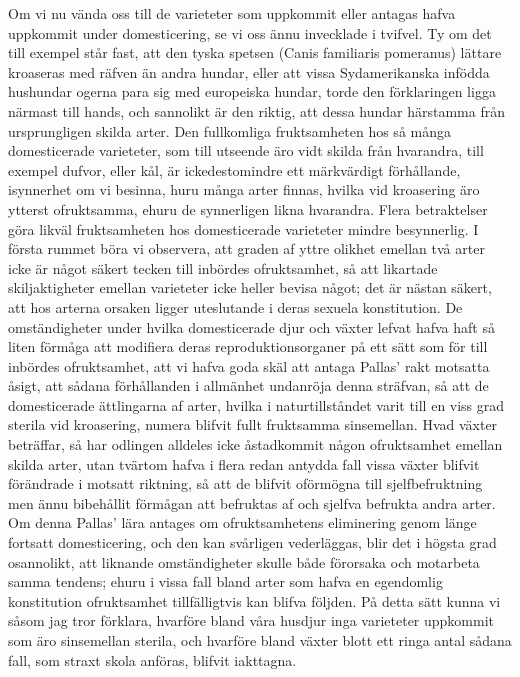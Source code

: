 Om vi nu vända oss till de varieteter som uppkommit eller antagas hafva uppkommit under domesticering, se vi oss ännu invecklade i tvifvel. Ty om det till exempel står fast, att den tyska spetsen (Canis familiaris pomeranus) lättare kroaseras med räfven än andra hundar, eller att vissa Sydamerikanska infödda hushundar ogerna para sig med europeiska hundar, torde den förklaringen ligga närmast till hands, och sannolikt är den riktig, att dessa hundar härstamma från ursprungligen skilda arter. Den fullkomliga fruktsamheten hos så många domesticerade varieteter, som till utseende äro vidt skilda från hvarandra, till exempel dufvor, eller kål, är ickedestomindre ett märkvärdigt förhållande, isynnerhet om vi besinna, huru många arter finnas, hvilka vid kroasering äro ytterst ofruktsamma, ehuru de synnerligen likna hvarandra. Flera betraktelser göra likväl fruktsamheten hos domesticerade varieteter mindre besynnerlig. I första rummet böra vi observera, att graden af yttre olikhet emellan två arter icke är något säkert tecken till inbördes ofruktsamhet, så att likartade skiljaktigheter emellan varieteter icke heller bevisa något; det är nästan säkert, att hos arterna orsaken ligger uteslutande i deras sexuela konstitution. De omständigheter under hvilka domesticerade djur och växter lefvat hafva haft så liten förmåga att modifiera deras reproduktionsorganer på ett sätt som för till inbördes ofruktsamhet, att vi hafva goda skäl att antaga Pallas’ rakt motsatta åsigt, att sådana förhållanden i allmänhet undanröja denna sträfvan, så att de domesticerade ättlingarna af arter, hvilka i naturtillståndet varit till en viss grad sterila vid kroasering, numera blifvit fullt fruktsamma sinsemellan. Hvad växter beträffar, så har odlingen alldeles icke åstadkommit någon ofruktsamhet emellan skilda arter, utan tvärtom hafva i flera redan antydda fall vissa växter blifvit förändrade i motsatt riktning, så att de blifvit oförmögna till sjelfbefruktning men ännu bibehållit förmågan att befruktas af och sjelfva befrukta andra arter. Om denna Pallas’ lära antages om ofruktsamhetens eliminering genom länge fortsatt domesticering, och den kan svårligen vederläggas, blir det i högsta grad osannolikt, att liknande omständigheter skulle både förorsaka och motarbeta samma tendens; ehuru i vissa fall bland arter som hafva en egendomlig konstitution ofruktsamhet tillfälligtvis kan blifva följden. På detta sätt kunna vi såsom jag tror förklara, hvarföre bland våra husdjur inga varieteter uppkommit som äro sinsemellan sterila, och hvarföre bland växter blott ett ringa antal sådana fall, som straxt skola anföras, blifvit iakttagna.

